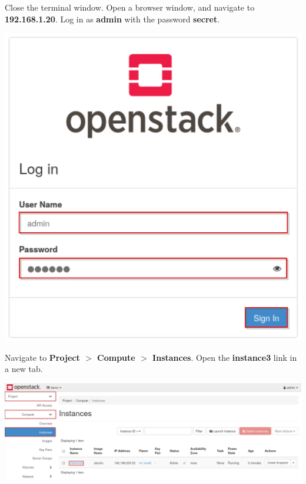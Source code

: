 \documentclass[letterpaper, 12pt]{article}
\begin{document}
\begin{enumerate}
    \begin{labstep}
        Close the terminal window.
        Open a browser window, and navigate to \textbf{192.168.1.20}.
        Log in as \textbf{admin} with the password \textbf{secret}.

        \begin{center}
            \includegraphics[scale=0.5]{images/part3/step3.png}
        \end{center}
    \end{labstep}

    \begin{labstep}
        Navigate to \textbf{Project $>$ Compute $>$ Instances}.
        Open the \textbf{instance3} link in a new tab.

        \begin{center}
            \includegraphics[width=\linewidth]{images/part3/step4.png}
        \end{center}
    \end{labstep}


\end{enumerate}
\end{document}
